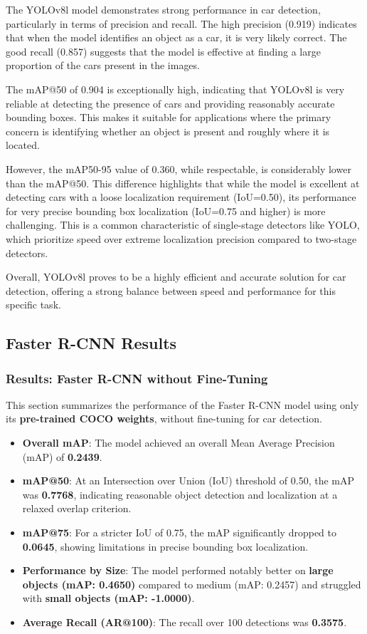 \documentclass[conference]{IEEEtran}
\begin{document}
The YOLOv8l model demonstrates strong performance in car detection, particularly in terms of precision and recall. The high precision (0.919) indicates that when the model identifies an object as a car, it is very likely correct. The good recall (0.857) suggests that the model is effective at finding a large proportion of the cars present in the images.

The mAP@50 of 0.904 is exceptionally high, indicating that YOLOv8l is very reliable at detecting the presence of cars and providing reasonably accurate bounding boxes. This makes it suitable for applications where the primary concern is identifying whether an object is present and roughly where it is located.

However, the mAP50-95 value of 0.360, while respectable, is considerably lower than the mAP@50. This difference highlights that while the model is excellent at detecting cars with a loose localization requirement (IoU=0.50), its performance for very precise bounding box localization (IoU=0.75 and higher) is more challenging. This is a common characteristic of single-stage detectors like YOLO, which prioritize speed over extreme localization precision compared to two-stage detectors.

Overall, YOLOv8l proves to be a highly efficient and accurate solution for car detection, offering a strong balance between speed and performance for this specific task.

\subsection{Faster R-CNN Results}
\label{ssec:fasterrcnn_results_overall} 

\subsubsection{Results: Faster R-CNN without Fine-Tuning}
\label{ssec:results_fasterrcnn_pretrained}

This section summarizes the performance of the Faster R-CNN model using only its \textbf{pre-trained COCO weights}, without fine-tuning for car detection.

\begin{itemize}
    \item \textbf{Overall mAP}: The model achieved an overall Mean Average Precision (mAP) of \textbf{0.2439}.
    \item \textbf{mAP@50}: At an Intersection over Union (IoU) threshold of 0.50, the mAP was \textbf{0.7768}, indicating reasonable object detection and localization at a relaxed overlap criterion.
    \item \textbf{mAP@75}: For a stricter IoU of 0.75, the mAP significantly dropped to \textbf{0.0645}, showing limitations in precise bounding box localization.
    \item \textbf{Performance by Size}: The model performed notably better on \textbf{large objects (mAP: 0.4650)} compared to medium (mAP: 0.2457) and struggled with \textbf{small objects (mAP: -1.0000)}.
    \item \textbf{Average Recall (AR@100)}: The recall over 100 detections was \textbf{0.3575}.
\end{itemize}
\end{document}

